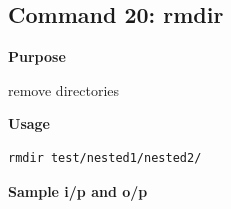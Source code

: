 \subsection{Command 20: rmdir} 
\textbf{Purpose}
\begin{flushleft}
 remove directories
\end{flushleft}
\textbf{Usage}
\begin{verbatim}
rmdir test/nested1/nested2/
\end{verbatim}
\textbf{Sample i/p and o/p}
\begin{figure}[H] 
\end{figure}
